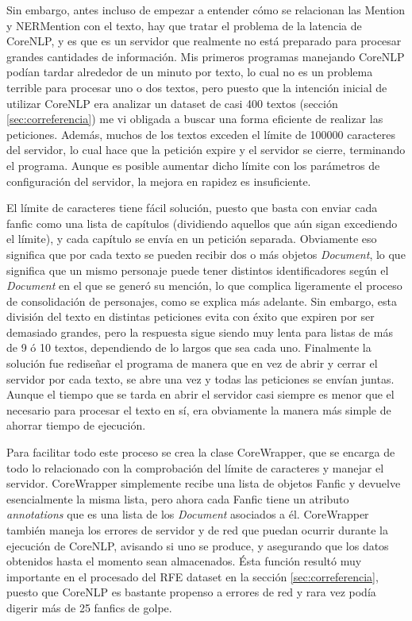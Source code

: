 \documentclass{pre-tfg}
\begin{document}
Sin embargo, antes incluso de empezar a entender cómo se relacionan las Mention y NERMention con el texto, hay que tratar el problema de la latencia de CoreNLP, y es que es un servidor que realmente no está preparado para procesar grandes cantidades de información. Mis primeros programas manejando CoreNLP podían tardar alrededor de un minuto por texto, lo cual no es un problema terrible para procesar uno o dos textos, pero puesto que la intención inicial de utilizar CoreNLP era analizar un dataset de casi 400 textos (sección \ref{sec:correferencia}) me vi obligada a buscar una forma eficiente de realizar las peticiones. Además, muchos de los textos exceden el límite de 100000 caracteres del servidor, lo cual hace que la petición expire y el servidor se cierre, terminando el programa. Aunque es posible aumentar dicho límite con los parámetros de configuración del servidor, la mejora en rapidez es insuficiente.

El límite de caracteres tiene fácil solución, puesto que basta con enviar cada fanfic como una lista de capítulos \label{nota:limiteCarac} (dividiendo aquellos que aún sigan excediendo el límite), y cada capítulo se envía en un petición separada. Obviamente eso significa que por cada texto se pueden recibir dos o más objetos \textit{Document}, lo que significa que un mismo personaje puede tener distintos identificadores según el \textit{Document} en el que se generó su mención, lo que complica ligeramente el proceso de consolidación de personajes, como se explica más adelante. Sin embargo, esta división del texto en distintas peticiones evita con éxito que expiren por ser demasiado grandes, pero la respuesta sigue siendo muy lenta para listas de más de 9 ó 10 textos, dependiendo de lo largos que sea cada uno.
Finalmente la solución fue rediseñar el programa de manera que en vez de abrir y cerrar el servidor por cada texto, se abre una vez y todas las peticiones se envían juntas. Aunque el tiempo que se tarda en abrir el servidor casi siempre es menor que el necesario para procesar el texto en sí, era obviamente la manera más simple de ahorrar tiempo de ejecución.

Para facilitar todo este proceso se crea la clase CoreWrapper, que se encarga de todo lo relacionado con la comprobación del límite de caracteres y manejar el servidor. CoreWrapper simplemente recibe una lista de objetos Fanfic y devuelve esencialmente la misma lista, pero ahora cada Fanfic tiene un atributo \textit{annotations} que es una lista de los \textit{Document} asociados a él.
CoreWrapper también maneja los errores de servidor y de red que puedan ocurrir durante la ejecución de CoreNLP, avisando si uno se produce, y asegurando que los datos obtenidos hasta el momento sean almacenados. Ésta función resultó muy importante en el procesado del RFE dataset en la sección \ref{sec:correferencia}, puesto que CoreNLP es bastante propenso a errores de red y rara vez podía digerir más de 25 fanfics de golpe. 
\end{document}
